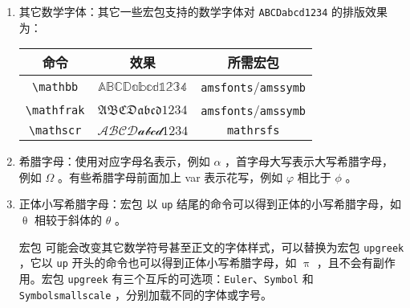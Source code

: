 \begin{enumerate}
\item 其它数学字体：其它一些宏包支持的数学字体对 \verb|ABCDabcd1234| 的排版效果为：

\begin{tcolorbox}[colback=white]
\begin{center}
\begin{tabular}{ccc}
    命令 & 效果 & 所需宏包 \\
    \hline
    \verb|\mathbb| & $\mathbb{ABCDabcd1234}$ & \verb|amsfonts|/\verb|amssymb| \\
    \verb|\mathfrak| & $\mathfrak{ABCDabcd1234}$ & \verb|amsfonts|/\verb|amssymb| \\
    \verb|\mathscr| & $\mathscr{ABCDabcd1234}$ & \verb|mathrsfs| \\
\end{tabular}
\end{center}
\end{tcolorbox}

\item 希腊字母：使用对应字母名表示，例如 \boxforcmd{\\alpha} $\alpha$ ，首字母大写表示大写希腊字母，例如 \boxforcmd{\\Omega} $\Omega$ 。有些希腊字母前面加上 var 表示花写，例如 \boxforcmd{\\varphi} $\varphi$ 相比于 \boxforcmd{\\phi} $\phi$ 。

\item 正体小写希腊字母：宏包  以 \verb|up| 结尾的命令可以得到正体的小写希腊字母，如 \boxforcmd{\\thetaup} $\uptheta$ 相较于斜体的 \boxforcmd{\\theta} $\theta$ 。

宏包  可能会改变其它数学符号甚至正文的字体样式，可以替换为宏包 \verb|upgreek| ，它以 \verb|up| 开头的命令也可以得到正体小写希腊字母，如 \boxforcmd{\\uppi} $\uppi$ ，且不会有副作用。宏包 \verb|upgreek| 有三个互斥的可选项：\verb|Euler|、\verb|Symbol| 和 \verb|Symbolsmallscale| ，分别加载不同的字体或字号。


\end{enumerate}